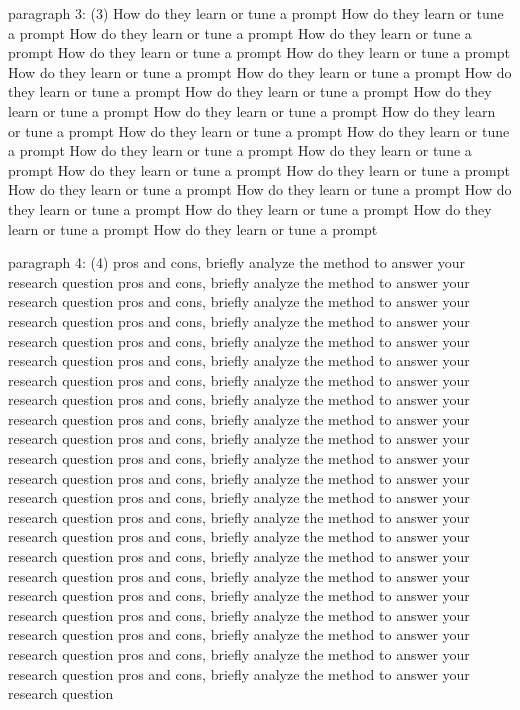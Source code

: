 paragraph 3: (3) How do they learn or tune a prompt  How do they learn or tune a prompt  How do they learn or tune a prompt  How do they learn or tune a prompt  How do they learn or tune a prompt  How do they learn or tune a prompt  How do they learn or tune a prompt  How do they learn or tune a prompt  How do they learn or tune a prompt  How do they learn or tune a prompt  How do they learn or tune a prompt  How do they learn or tune a prompt  How do they learn or tune a prompt  How do they learn or tune a prompt  How do they learn or tune a prompt  How do they learn or tune a prompt  How do they learn or tune a prompt  How do they learn or tune a prompt  How do they learn or tune a prompt  How do they learn or tune a prompt  How do they learn or tune a prompt  How do they learn or tune a prompt  How do they learn or tune a prompt  How do they learn or tune a prompt  How do they learn or tune a prompt 

paragraph 4: (4) pros and cons, briefly analyze the method to answer your research question  pros and cons, briefly analyze the method to answer your research question  pros and cons, briefly analyze the method to answer your research question  pros and cons, briefly analyze the method to answer your research question  pros and cons, briefly analyze the method to answer your research question  pros and cons, briefly analyze the method to answer your research question  pros and cons, briefly analyze the method to answer your research question  pros and cons, briefly analyze the method to answer your research question  pros and cons, briefly analyze the method to answer your research question  pros and cons, briefly analyze the method to answer your research question  pros and cons, briefly analyze the method to answer your research question  pros and cons, briefly analyze the method to answer your research question  pros and cons, briefly analyze the method to answer your research question  pros and cons, briefly analyze the method to answer your research question  pros and cons, briefly analyze the method to answer your research question  pros and cons, briefly analyze the method to answer your research question  pros and cons, briefly analyze the method to answer your research question  pros and cons, briefly analyze the method to answer your research question  pros and cons, briefly analyze the method to answer your research question  pros and cons, briefly analyze the method to answer your research question  pros and cons, briefly analyze the method to answer your research question  pros and cons, briefly analyze the method to answer your research question 

